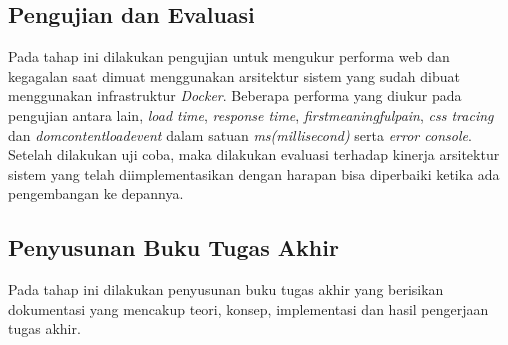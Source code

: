 		\subsection{Pengujian dan Evaluasi}
			Pada tahap ini dilakukan pengujian untuk mengukur performa web dan kegagalan saat dimuat menggunakan arsitektur sistem yang sudah dibuat menggunakan infrastruktur \textit{Docker}. Beberapa performa yang diukur pada pengujian antara lain, \textit{load time}, \textit{response time}, \textit{firstmeaningfulpain}, \textit{css tracing} dan \textit{domcontentloadevent} dalam satuan \textit{ms(millisecond)} serta \textit{error console}. Setelah dilakukan uji coba, maka dilakukan evaluasi terhadap kinerja arsitektur sistem yang telah diimplementasikan dengan harapan bisa diperbaiki ketika ada pengembangan ke depannya.
		\subsection{Penyusunan Buku Tugas Akhir}
			Pada tahap ini dilakukan penyusunan buku tugas akhir yang berisikan dokumentasi yang mencakup teori, konsep, implementasi dan hasil pengerjaan tugas akhir.
	
